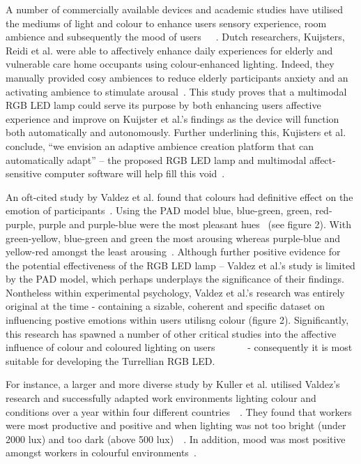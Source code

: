 \documentclass{sigchi}
\begin{document}
A number of commercially available devices and academic studies have utilised the mediums of light and colour to enhance users sensory experience, room ambience and subsequently the mood of users~\cite{flores2017effect}~\cite{kuijsters2011improving}~\cite{kuijsters2015lighting}. Dutch researchers, Kuijsters, Reidi et al. were able to affectively enhance daily experiences for elderly and vulnerable care home occupants using colour-enhanced lighting. Indeed, they manually provided cosy ambiences to reduce elderly participants anxiety and an activating ambience to stimulate arousal~\cite{kuijsters2015lighting}. This study proves that a multimodal RGB LED lamp could serve its purpose by both enhancing users affective experience and improve on Kuijster et al.’s findings as the device will function both automatically and autonomously. Further underlining this, Kujisters et al. conclude, “we envision an adaptive ambience creation platform that can automatically adapt” – the proposed RGB LED lamp and multimodal affect-sensitive computer software will help fill this void~\cite{kuijsters2015lighting}.

An oft-cited study by Valdez et al. found that colours had definitive effect on the emotion of participants~\cite{valdez1994effects}. Using the PAD model blue, blue-green, green, red-purple, purple and purple-blue were the most pleasant hues~\cite{valdez1994effects} (see figure 2). With green-yellow, blue-green and green the most arousing whereas purple-blue and yellow-red amongst the least arousing~\cite{valdez1994effects}. Although further positive evidence for the potential effectiveness of the RGB LED lamp – Valdez et al.’s study is limited by the PAD model, which perhaps underplays the significance of their findings. Nontheless within experimental psychology, Valdez et al.'s research was entirely original at the time -  containing a sizable, coherent and specific dataset on influencing postive emotions within users utilisng colour (figure 2). Significantly, this research has spawned a number of other critical studies into the affective influence of colour and coloured lighting on users~\cite{han2017effects}~\cite{jo2014smart}~\cite{kim2014study}~\cite{lee2019effects}~\cite{wardono2012effects}~\cite{yang2015lighting} - consequently it is most suitable for developing the Turrellian RGB LED.

For instance, a larger and more diverse study by Kuller et al. utilised Valdez’s research and successfully adapted work environments lighting colour and conditions over a year within four different countries~\cite{kuller2006impact}~\cite{kuller2009color}. They found that workers were most productive and positive and when lighting was not too bright (under 2000 lux) and too dark (above 500 lux)~\cite{kuller2006impact}~\cite{kuller2009color}. In addition, mood was most positive amongst workers in colourful environments~\cite{kuller1986physiological}.
\end{document}

